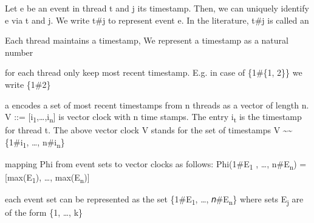 \documentclass[landscape, a4paper]{article}
\begin{document}
\begin{minipage}[t]{0.19\linewidth}
	\raggedright

	\begin{betterlist}
		\item Let e be an event in thread t and j its timestamp. Then, we can uniquely identify e via t and j. We write t\#j to represent event e. In the literature, t\#j is called an 
		\begin{betterlist}
			\item {} Each thread maintains a timestamp, We represent a timestamp as a natural number%
			\item for each thread only keep most recent timestamp. E.g. in case of \{1\#\{1, 2\}\} we write \{1\#2\}
		\end{betterlist}
		\item a  encodes a set of most recent timestamps from n threads as a vector of length n. V ::= [i\textsubscript{1},\ldots ,i\textsubscript{n}] is vector clock with n time stamps. The entry i\textsubscript{t} is the timestamp for thread t. The above vector clock V stands for the set of timestamps V  \sim\sim  \{1\#i\textsubscript{1}, \ldots, n\#i\textsubscript{n}\} %
		\begin{betterlist}
			\item mapping Phi from event sets to vector clocks as follows: Phi({1\#E\textsubscript{1} , \ldots, n\#E\textsubscript{n}}) = [max(E\textsubscript{1}), \ldots, max(E\textsubscript{n})]
			\begin{betterlist}
				\item each event set can be represented as the set \{1\#E\textsubscript{1}, \ldots, 𝑛\#E\textsubscript{n}\} where sets E\textsubscript{j} are of the form \{1, \ldots, k\}
			\end{betterlist}
			\item \cul{Properties:}
			\begin{enumerate}

\end{enumerate}
\end{betterlist}
\end{betterlist}
\end{minipage}
\end{document}
